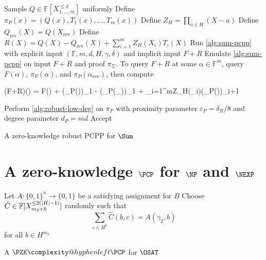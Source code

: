 \documentclass[english,12pt]{reedthesis}
\makeatletter
\theoremstyle{plain}
\theoremstyle{definition}
\theoremstyle{remark}
\DeclarePairedDelimiter{\abs}{\lvert}{\rvert}
\newcommand{\PZKPCP}{%
  \PZK\complexity@hyphenleft\PCP
}
\makeatother
\begin{document}
\begin{algorithm}[htbp]
  Sample $Q \in \mathbb{F}[X_{1, \ldots, m}^{\le d}]$ uniformly\;
  Define $\pi_{P}(x) = (Q(x), T_{1}(x), \ldots, T_{m}(x))$\;
  Define $Z_{H} = \prod_{a \in H}(X - a)$\;
  Define $Q_{\text{rev}}(X) = Q(X_{\text{rev}})$\; %
  Define $R(X) = Q(X) - Q_{\text{rev}}(X) + \sum_{i=1}^{m}Z_{H}(X_{i})T_{i}(X)$\;
  Run \cref{alg:sum-pcpp} with explicit input $(\mathbb{F}, m, d, H, \gamma, \delta)$ and
  implicit input $F + R$\;
  \;
  Emulate \cref{alg:sum-pcpp} on input $F + R$ and proof $\pi_{\Sigma}$. To query
  $F + R$ at some $\alpha \in \mathbb{F}^{m}$, query $F(\alpha)$, $\pi_{P}(\alpha)$, and
  $\pi_{P}(\alpha_{\text{rev}})$, then compute
  \begin{algomathdisplay}
    (F+R)(\alpha) = F(\alpha) + (\pi_{P}(\alpha))_{1} - (\pi_{P}(\alpha_{}))_{1} + \sum_{i=1}^{m}Z_{H}(\alpha_{i})(\pi_{P}(\alpha))_{i+1}
  \end{algomathdisplay}
  Perform \cref{alg:robust-low-deg} on $\pi_{P}$ with proximity parameter
  $\varepsilon_{P} = \delta_{R}/8$ and degree parameter $d_{P} = md$\;
  Accept\;
  \caption{A zero-knowledge robust PCPP for $\Sum$~\cite[Construction
    5.2]{GOS25}}\label{alg:sum-pzk-pcpp}
\end{algorithm}

\section{A zero-knowledge $\PCP$ for $\NP$ and $\NEXP$}\label{sec:pzkpcp-np-nexp}

\begin{algorithm}[htbp]
  Let $A: \{0, 1\}^{n} \rightarrow \{0, 1\}$ be a satisfying assignment for $B$\;
  Choose $\hat{C} \in \mathbb{F}[X_{m_{2} + k}^{\le 2(\abs{H} - 1)}]$ randomly such
  that
  \[
    \sum_{c \in H^{k}}\hat{C}(b, c) = A(\gamma_{2}, b)
  \]
  for all $b \in H^{m_{2}}$\;
  \;
  \caption{A $\PZKPCP$ for $\OSAT$~\cite[Theorem 6.3]{GOS25}}\label{alg:pzkpcp-np}
\end{algorithm}
\end{document}
